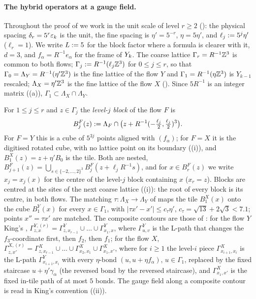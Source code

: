 
\paragraph{The hybrid operators at a gauge field.}
Throughout the proof of  we work in the unit scale of level $r\ge2$ (\cite[(2.20)]{K1}): the physical spacing $\delta_r=5^r\varepsilon_k$ is the unit, the fine spacing is $\eta'=5^{-r}$, $\eta=5\eta'$, and $\ell_j:=5^j\eta'$ ($\ell_r=1$). We write $L:=5$ for the block factor where a formula is clearer with it, $d=3$, and $f_\alpha=R^{-1}e_\alpha$ for the frame of $Y_k$. The coarse lattice $\Gamma_r=R^{-1}\mathbb Z^3$ is common to both flows; $\Gamma_j:= R^{-1}(\ell_j\mathbb Z^3)$ for $0\le j\le r$, so that $\Gamma_0=\Lambda_Y=R^{-1}(\eta'\mathbb Z^3)$ is the fine lattice of the flow $Y$ and $\Gamma_1=R^{-1}(\eta\mathbb Z^3)$ is $Y_{k-1}$ rescaled; $\Lambda_X=\eta'\mathbb Z^3$ is the fine lattice of the flow $X$ (). Since $5R^{-1}$ is an integer matrix ((a)), $\Gamma_1\subset\Lambda_X\cap\Lambda_Y$.

For $1\le j\le r$ and $z\in\Gamma_j$ the \emph{level-$j$ block} of the flow $F$ is
\[
B^F_j(z):=\Lambda_F\cap\big(z+R^{-1}(-\tfrac{\ell_j}2,\tfrac{\ell_j}2)^3\big).
\]
For $F=Y$ this is a cube of $5^{3j}$ points aligned with $(f_\alpha)$; for $F=X$ it is the digitised rotated cube, with no lattice point on its boundary ((i)), and $B^X_1(z)=z+\eta'B_0$ is the tile. Both are nested, $B^F_{j+1}(z)=\bigcup_{s\in\{-2,\dots,2\}^3}B^F_j(z+\ell_jR^{-1}s)$, and for $x\in B^F_r(z)$ we write $x_j=x_j(x)$ for the centre of the level-$j$ block containing $x$ ($x_r=z$). Blocks are centred at the sites of the next coarse lattice ((i)): the root of every block is its centre, in both flows. The matching $\tau:\Lambda_X\to\Lambda_Y$ of  maps the tile $B^X_1(x)$ onto the cube $B^Y_1(x)$ for every $x\in\Gamma_1$, with $|\tau x'-x'|\le c_\tau\eta'$, $c_\tau=\sqrt{13}+2\sqrt3<7.1$; points $x''=\tau x'$ are matched. The composite contours are those of : for the flow $Y$ King's \cite[(2.12)]{K1}, $\Gamma^{Y,(r)}_{z,x}=\Gamma^Y_{z,x_{r-1}}\cup\dots\cup\Gamma^Y_{x_1,x}$, where $\Gamma^Y_{u,v}$ is the L-path that changes the $f_3$-coordinate first, then $f_2$, then $f_1$; for the flow $X$, $\Gamma^{X,(r)}_{z,x'}=\Gamma^X_{z,x_{r-1}}\cup\dots\cup\Gamma^X_{x_2,x_1}\cup\Gamma^X_{x_1,x'}$, where for $i\ge1$ the level-$i$ piece $\Gamma^X_{x_{i+1},x_i}$ is the L-path $\Gamma^Y_{x_{i+1},x_i}$ with every $\eta$-bond $(u,u+\eta f_\alpha)$, $u\in\Gamma_1$, replaced by the fixed staircase $u+\eta'\gamma_\alpha$ (the reversed bond by the reversed staircase), and $\Gamma^X_{x_1,x'}$ is the fixed in-tile path of at most $5$ bonds. The gauge field along a composite contour is read in King's convention \cite[(2.19)]{K1} ((ii)).

